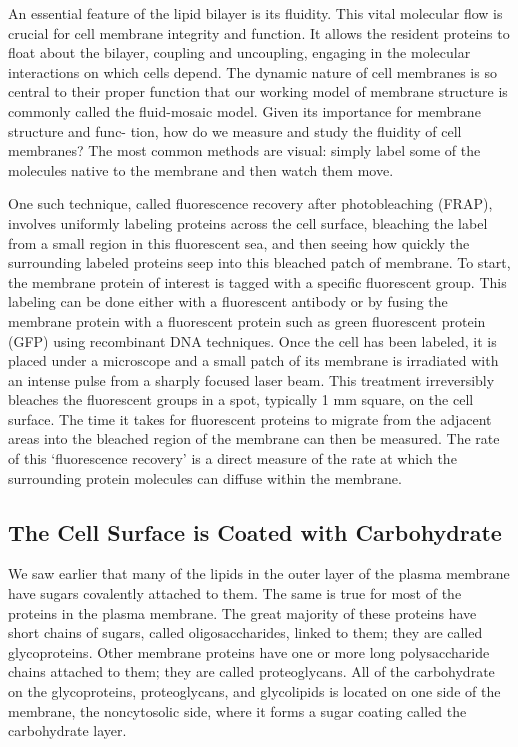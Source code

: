 An essential feature of the lipid bilayer is its fluidity. This
vital molecular flow is crucial for cell membrane integrity and function. 
It allows the resident proteins to float
about the bilayer, coupling and uncoupling, engaging in
the molecular interactions on which cells depend. The
dynamic nature of cell membranes is so central to their
proper function that our working model of membrane
structure is commonly called the fluid-mosaic model.
Given its importance for membrane structure and func-
tion, how do we measure and study the fluidity of cell
membranes? The most common methods are visual:
simply label some of the molecules native to the membrane and then watch them move.

One such technique, called fluorescence recovery after
photobleaching (FRAP), involves uniformly labeling proteins 
across the cell surface, bleaching the label from a
small region in this fluorescent sea, and then seeing how
quickly the surrounding labeled proteins seep into this
bleached patch of membrane. To start, the membrane
protein of interest is tagged with a specific fluorescent
group. This labeling can be done either with a fluorescent 
antibody or by fusing the membrane protein with
a fluorescent protein such as green fluorescent protein
(GFP) using recombinant DNA techniques.
Once the cell has been labeled, it is placed under a
microscope and a small patch of its membrane is irradiated 
with an intense pulse from a sharply focused laser
beam. This treatment irreversibly bleaches the fluorescent 
groups in a spot, typically 1 mm square, on the cell surface.
The time it takes for fluorescent
proteins to migrate from the adjacent areas into the
bleached region of the membrane can then be measured. The rate of this ‘fluorescence recovery’ is a direct
measure of the rate at which the surrounding protein
molecules can diffuse within the membrane.

\subsection{The Cell Surface is Coated with Carbohydrate}

We saw earlier that many of the lipids in the outer layer of the plasma
membrane have sugars covalently attached to them. The same is true
for most of the proteins in the plasma membrane. The great majority of
these proteins have short chains of sugars, called oligosaccharides, linked
to them; they are called glycoproteins. Other membrane proteins have
one or more long polysaccharide chains attached to them; they are called
proteoglycans. All of the carbohydrate on the glycoproteins, proteoglycans,
and glycolipids is located on one side of the membrane, the noncytosolic
side, where it forms a sugar coating called the carbohydrate layer.


